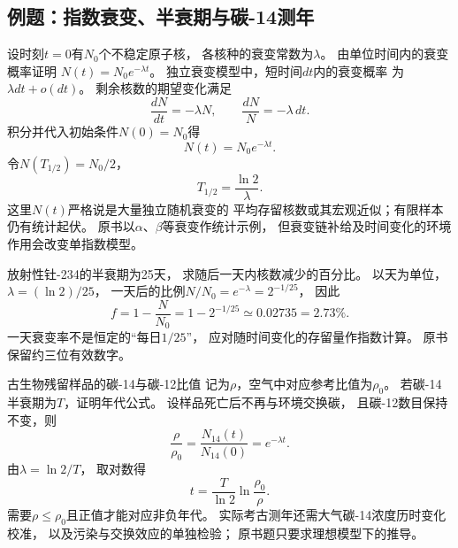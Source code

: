 \subsection{例题：指数衰变、半衰期与碳-14测年}

\problemtext 设时刻$t=0$有$N_0$个不稳定原子核，
各核种的衰变常数为$\lambda$。
由单位时间内的衰变概率证明
$N(t)=N_0e^{-\lambda t}$。
\workings
独立衰变模型中，短时间$dt$内的衰变概率
为$\lambda dt+o(dt)$。
剩余核数的期望变化满足
\[
 \frac{dN}{dt}=-\lambda N,\qquad
 \frac{dN}{N}=-\lambda\,dt.
\]
积分并代入初始条件$N(0)=N_0$得
\[
 \boxed{N(t)=N_0e^{-\lambda t}}.
\]
令$N(T_{1/2})=N_0/2$，
\[
 \boxed{T_{1/2}=\frac{\ln2}{\lambda}}.
\]
\crosscheck 这里$N(t)$严格说是大量独立随机衰变的
平均存留核数或其宏观近似；有限样本仍有统计起伏。
原书以$\alpha$、$\beta$等衰变作统计示例，
但衰变链补给及时间变化的环境作用会改变单指数模型。

\problemtext 放射性钍-234的半衰期为25天，
求随后一天内核数减少的百分比。
\workings
以天为单位，
$\lambda=(\ln2)/25$，
一天后的比例$N/N_0=e^{-\lambda}=2^{-1/25}$，
因此
\[
 \boxed{f=1-\frac{N}{N_0}
 =1-2^{-1/25}\simeq0.02735=2.73\%}.
\]
\crosscheck 一天衰变率不是恒定的“每日$1/25$”，
应对随时间变化的存留量作指数计算。
原书保留约三位有效数字。

\problemtext 古生物残留样品的碳-14与碳-12比值
记为$\rho$，空气中对应参考比值为$\rho_0$。
若碳-14半衰期为$T$，证明年代公式。
\workings
设样品死亡后不再与环境交换碳，
且碳-12数目保持不变，则
\[
 \frac{\rho}{\rho_0}=
 \frac{N_{14}(t)}{N_{14}(0)}
 =e^{-\lambda t}.
\]
由$\lambda=\ln2/T$，
取对数得
\[
 \boxed{t=\frac{T}{\ln2}\ln\frac{\rho_0}{\rho}}.
\]
\crosscheck 需要$\rho\le\rho_0$且正值才能对应非负年代。
实际考古测年还需大气碳-14浓度历时变化校准，
以及污染与交换效应的单独检验；
原书题只要求理想模型下的推导。
